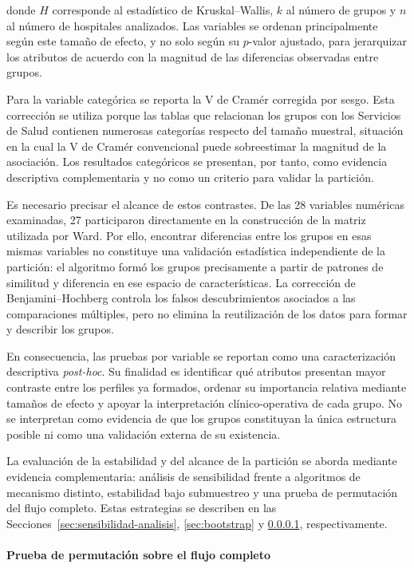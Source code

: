 donde $H$ corresponde al estadístico de Kruskal--Wallis, $k$ al número de
grupos y $n$ al número de hospitales analizados. Las variables se ordenan
principalmente según este tamaño de efecto, y no solo según su $p$-valor
ajustado, para jerarquizar los atributos de acuerdo con la magnitud de las
diferencias observadas entre grupos.

Para la variable categórica se reporta la V de Cramér corregida por sesgo. Esta
corrección se utiliza porque las tablas que relacionan los grupos con los
Servicios de Salud contienen numerosas categorías respecto del tamaño muestral,
situación en la cual la V de Cramér convencional puede sobreestimar la magnitud
de la asociación. Los resultados categóricos se presentan, por tanto, como
evidencia descriptiva complementaria y no como un criterio para validar la
partición.

Es necesario precisar el alcance de estos contrastes. De las 28 variables
numéricas examinadas, 27 participaron directamente en la construcción de la
matriz utilizada por Ward. Por ello, encontrar diferencias entre los grupos en
esas mismas variables no constituye una validación estadística independiente de
la partición: el algoritmo formó los grupos precisamente a partir de patrones de
similitud y diferencia en ese espacio de características. La corrección de
Benjamini--Hochberg controla los falsos descubrimientos asociados a las
comparaciones múltiples, pero no elimina la reutilización de los datos para
formar y describir los grupos.

En consecuencia, las pruebas por variable se reportan como una
caracterización descriptiva \textit{post-hoc}. Su finalidad es
identificar qué atributos presentan mayor contraste entre los perfiles ya
formados, ordenar su importancia relativa mediante tamaños de efecto y apoyar
la interpretación clínico-operativa de cada grupo. No se interpretan como
evidencia de que los grupos constituyan la única estructura posible ni como
una validación externa de su existencia.

La evaluación de la estabilidad y del alcance de la partición se aborda mediante
evidencia complementaria: análisis de sensibilidad frente a algoritmos de
mecanismo distinto, estabilidad bajo submuestreo y una prueba de permutación del
flujo completo. Estas estrategias se describen en las
Secciones~\ref{sec:sensibilidad-analisis}, \ref{sec:bootstrap} y
\ref{sec:permutacion-circularidad}, respectivamente.


\paragraph{Prueba de permutación sobre el flujo completo}
\label{sec:permutacion-circularidad}

